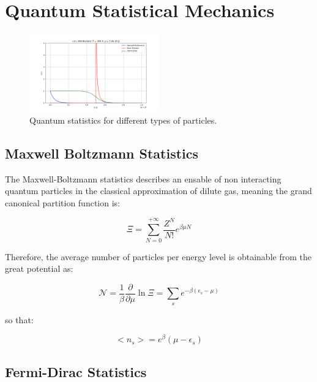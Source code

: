 \documentclass{article}
\begin{document}
\newpage

\section{Quantum Statistical Mechanics}

\begin{figure}[h]
    \centering
    \includegraphics[width=0.5\textwidth]{images/statistical-physics/n-distributions.png}
    \caption{Quantum statistics for different types of particles.}
    \label{fig:quantum-statistics}
\end{figure}

\subsection{Maxwell Boltzmann Statistics}

The Maxwell-Boltzmann statistics describes an ensable of non interacting quantum particles in the classical
approximation of dilute gas, meaning the grand canonical partition function is:

\begin{equation}
    \Xi=\sum_{N=0}^{+\infty}\frac{Z^N}{N!}e^{\beta\mu N}
\end{equation}

Therefore, the average number of particles per energy level is obtainable from the great potential as:

\begin{equation}
    \mathcal{N}=\frac{1}{\beta}\frac{\partial}{\partial \mu}\ln{\Xi}=\sum_{s} e^{-\beta(\epsilon_s-\mu)}
\end{equation}

so that:

\begin{equation}
    <n_s>=e^\beta(\mu-\epsilon_s)
\end{equation}


\subsection{Fermi-Dirac Statistics}
\end{document}
